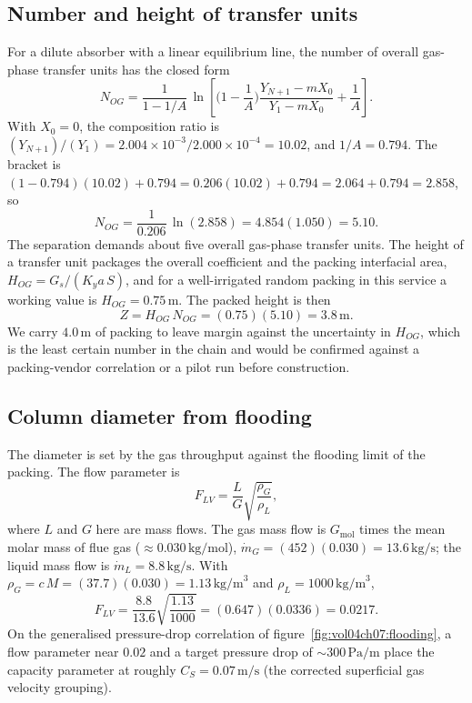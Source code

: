 

\subsection{Number and height of transfer units}

For a dilute absorber with a linear equilibrium line, the number of
overall gas-phase transfer units has the closed form
\[
N_{OG} = \frac{1}{1 - 1/A}\,\ln\!\left[\Big(1 - \frac{1}{A}\Big)
\frac{Y_{N+1}-mX_0}{Y_1-mX_0} + \frac{1}{A}\right].
\]
With $X_0 = 0$, the composition ratio is $(Y_{N+1})/(Y_1) =
2.004\times 10^{-3}/2.000\times 10^{-4} = 10.02$, and $1/A = 0.794$. The
bracket is $(1-0.794)(10.02) + 0.794 = 0.206(10.02) + 0.794 = 2.064 +
0.794 = 2.858$, so
\[
N_{OG} = \frac{1}{0.206}\,\ln(2.858) = 4.854(1.050) = 5.10.
\]
The separation demands about five overall gas-phase transfer units. The
height of a transfer unit packages the overall coefficient and the
packing interfacial area, $H_{OG} = G_s/(K_y a\, S)$, and for a
well-irrigated random packing in this service a working value is
$H_{OG} = 0.75\,\text{m}$. The packed height is then
\[
Z = H_{OG}\,N_{OG} = (0.75)(5.10) = 3.8\,\text{m}.
\]
We carry $4.0\,\text{m}$ of packing to leave margin against the
uncertainty in $H_{OG}$, which is the least certain number in the chain
and would be confirmed against a packing-vendor correlation or a pilot
run before construction.

\subsection{Column diameter from flooding}

The diameter is set by the gas throughput against the flooding limit of
the packing. The flow parameter is
\[
F_{LV} = \frac{L}{G}\sqrt{\frac{\rho_G}{\rho_L}},
\]
where $L$ and $G$ here are mass flows. The gas mass flow is
$G_{\text{mol}}$ times the mean molar mass of flue gas
($\approx 0.030\,\text{kg/mol}$), $\dot m_G = (452)(0.030) =
13.6\,\text{kg/s}$; the liquid mass flow is $\dot m_L = 8.8\,\text{kg/s}$.
With $\rho_G = c\,M = (37.7)(0.030) = 1.13\,\text{kg/m}^3$ and
$\rho_L = 1000\,\text{kg/m}^3$,
\[
F_{LV} = \frac{8.8}{13.6}\sqrt{\frac{1.13}{1000}} = (0.647)(0.0336) =
0.0217.
\]
On the generalised pressure-drop correlation of
figure~\ref{fig:vol04ch07:flooding}, a flow parameter near $0.02$ and a
target pressure drop of $\sim 300\,\text{Pa/m}$ place the capacity
parameter at roughly $C_S = 0.07\,\text{m/s}$ (the corrected superficial
gas velocity grouping).

